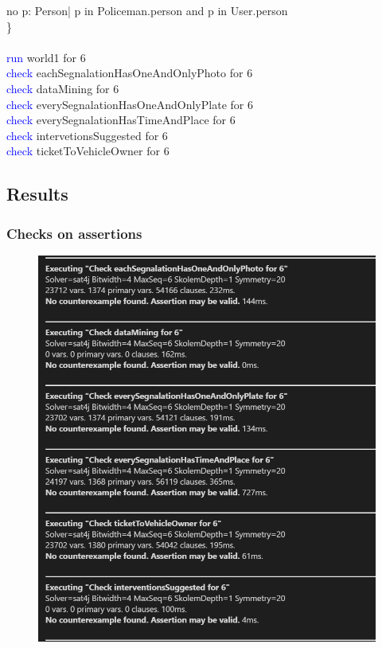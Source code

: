 no p: Person| p in Policeman.person and p in User.person\\
\}\\
\\
\textcolor{blue}{run} world1 for 6\\
\textcolor{blue}{check}
\textcolor{mycolor}{eachSegnalationHasOneAndOnlyPhoto} for 6\\
\textcolor{blue}{check}
\textcolor{mycolor}{dataMining} for 6\\
\textcolor{blue}{check}
\textcolor{mycolor}{everySegnalationHasOneAndOnlyPlate} for 6\\
\textcolor{blue}{check}
\textcolor{mycolor}{everySegnalationHasTimeAndPlace} for 6\\
\textcolor{blue}{check}
\textcolor{mycolor}{intervetionsSuggested} for 6\\
\textcolor{blue}{check}
\textcolor{mycolor}{ticketToVehicleOwner} for 6\\
\newpage
\subsection{Results}
\subsubsection{Checks on assertions}
\begin{figure}[h]
	\includegraphics[scale=0.75]{Images/Assert}
\end{figure}
